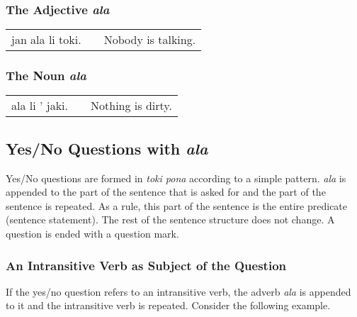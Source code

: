 %
\subsubsection*{The Adjective \textit{ala}}
%
%
\begin{supertabular}{p{5,5cm}|ll}
    jan ala li toki. &  & Nobody is talking. \\
\end{supertabular}

%
\subsubsection*{The Noun \textit{ala}}
%
%

\begin{supertabular}{p{5,5cm}|ll}
    ala li ' jaki. &  & Nothing is dirty. \\
\end{supertabular}

%
%
\subsection*{Yes/No Questions with \textit{ala}}
%
%

Yes/No questions are formed in \textit{toki pona} according to a simple pattern.
\textit{ala} is appended to the part of the sentence that is asked for and the part of the sentence is repeated.
As a rule, this part of the sentence is the entire predicate (sentence statement).
The rest of the sentence structure does not change.
A question is ended with a question mark.

%
\subsubsection*{An Intransitive Verb as Subject of the Question}
%

If the yes/no question refers to an intransitive verb, the adverb \textit{ala} is appended to it and the intransitive verb is repeated.
Consider the following example.

